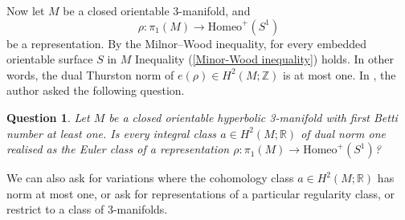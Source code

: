 \documentclass[11pt]{amsart}
\newtheorem{question}[thm]{Question}
\theoremstyle{remark}
\theoremstyle{definition}
\begin{document}
	
	Now let $M$ be a closed orientable 3-manifold, and 
	\[ \rho \colon \pi_1(M) \rightarrow \mathrm{Homeo}^+(S^1) \]
	be a representation. By the Milnor--Wood inequality, for every embedded orientable surface $S$ in $M$ Inequality (\ref{Minor-Wood inequality}) holds. In other words, the dual Thurston norm of $e(\rho) \in H^2(M ; \mathbb{Z})$ is at most one. In \cite{yazdi2020thurston}, the author asked the following question.
	
	\begin{question}
		Let $M$ be a closed orientable hyperbolic 3-manifold with first Betti number at least one. Is every integral class $a \in H^2(M ; \mathbb{R})$ of dual norm one realised as the Euler class of a representation $\rho \colon \pi_1(M) \rightarrow \mathrm{Homeo}^+(S^1)$?
		\label{que:euler class one for actions}
	\end{question}

	We can also ask for variations where the cohomology class $a \in H^2(M ; \mathbb{R})$ has norm at most one, or ask for representations of a particular regularity class, or restrict to a class of 3-manifolds.  
	
\end{document}
